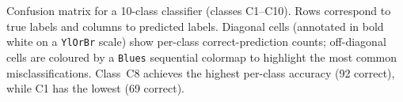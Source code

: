\caption{Confusion matrix for a 10-class classifier (classes C1--C10). Rows correspond to true labels and columns to predicted labels. Diagonal cells (annotated in bold white on a \texttt{YlOrBr} scale) show per-class correct-prediction counts; off-diagonal cells are coloured by a \texttt{Blues} sequential colormap to highlight the most common misclassifications. Class~C8 achieves the highest per-class accuracy (92 correct), while C1 has the lowest (69 correct).}
